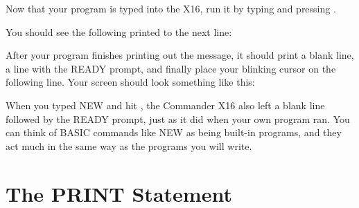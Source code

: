
Now that your program is typed into the X16, run it by typing
 and pressing \returnkey.

You should see the following printed to the next line:


After your program finishes printing out the message, it should print a blank
line, a line with the {\ttfamily READY} prompt, and finally place your blinking
cursor on the following line.  Your screen should look something like this:\\

\begin{center}
\end{center}

When you typed {\ttfamily NEW} and hit \returnkey, the Commander X16 also left
a blank line followed by the {\ttfamily READY} prompt, just as it did when your
own program ran.  You can think of BASIC commands like {\ttfamily NEW} as being
built-in programs, and they act much in the same way as the programs you will
write.\\


\chapter*{The PRINT Statement}

